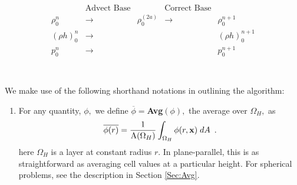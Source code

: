 \begin{equation}
\left.\begin{array}{ccccccc}
& \text{Advect Base} & & \text{Correct Base} & \\
\rho_0^n & \longrightarrow & \rho_0^{(2a)} & \longrightarrow & \rho_0^{n+1} \\
(\rho h)_0^n & \longrightarrow & & & (\rho h)_0^{n+1} \\
p_0^n & \longrightarrow & & & p_0^{n+1} \\
\end{array}\right.\nonumber
\end{equation}
\\ \\
We make use of the following shorthand notations in outlining the algorithm:
\begin{enumerate}

\item For any quantity, $\phi,$ we define $\overline{\phi} = ${\bf Avg}$(\phi),$ 
the average over $\Omega_H,$ as
\begin{equation}
\overline{\phi(r)}
= \frac{1}{\mathrm{A}(\Omega_H)}\int_{\Omega_H} \phi(r,{\bf x}) \; dA \enskip .
\end{equation}
here $\Omega_H$ is a layer at constant radius $r$.  In plane-parallel, this is 
as straightforward as averaging cell values at a particular height.  For spherical 
problems, see the description in Section \ref{Sec:Avg}.


\end{enumerate}
